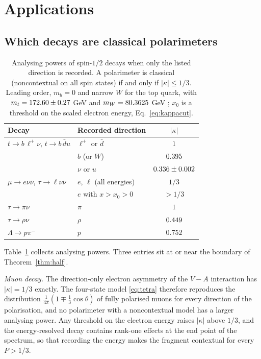 \section{Applications}
\label{sec:apps}

\subsection{Which decays are classical polarimeters}

\begin{table}[t]
\caption{Analysing powers of spin-$1/2$ decays when only the listed direction is recorded. A polarimeter is classical (noncontextual on all spin states) if and only if $|\kappa|\le1/3$. Leading order, $m_b=0$ and narrow $W$ for the top quark, with $m_t=172.60\pm0.27$ GeV and $m_W=80.3625$ GeV \cite{pdg2026}; $x_0$ is a threshold on the scaled electron energy, Eq.~\eqref{eq:kappacut}.}
\label{tab:kappa}
\begin{ruledtabular}
\begin{tabular}{llc}
Decay & Recorded direction & $|\kappa|$\\
\hline
$t\to b\,\ell^+\nu$, $t\to b\,\bar d u$ & $\ell^+$ or $\bar d$ & $1$\\
 & $b$ (or $W$) & $0.395$\\
 & $\nu$ or $u$ & $0.336\pm0.002$\\
$\mu\to e\nu\bar\nu$, $\tau\to\ell\nu\bar\nu$ & $e$, $\ell$ (all energies) & $1/3$\\
 & $e$ with $x>x_0>0$ & $>1/3$\\
$\tau\to\pi\nu$ & $\pi$ & $1$\\
$\tau\to\rho\nu$ & $\rho$ & $0.449$\\
$\Lambda\to p\pi^-$ & $p$ & $0.752$\\
\end{tabular}
\end{ruledtabular}
\end{table}

Table~\ref{tab:kappa} collects analysing powers. Three entries sit at or near the boundary of Theorem~\ref{thm:half}.

\emph{Muon decay.} The direction-only electron asymmetry of the $V\!-\!A$ interaction has $|\kappa|=1/3$ exactly. The four-state model \eqref{eq:tetra} therefore reproduces the distribution $\frac{1}{4\pi}(1\mp\frac13\cos\theta)$ of fully polarised muons for every direction of the polarisation, and no polarimeter with a noncontextual model has a larger analysing power. Any threshold on the electron energy raises $|\kappa|$ above $1/3$, and the energy-resolved decay contains rank-one effects at the end point of the spectrum, so that recording the energy makes the fragment contextual for every $P>1/3$.

